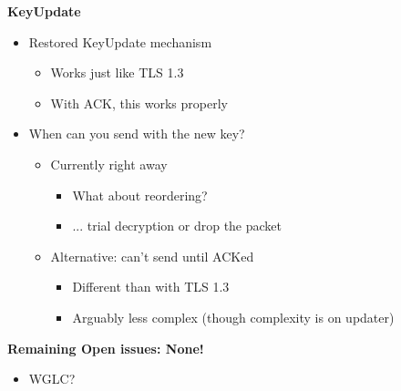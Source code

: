 \documentclass[helvetica]{seminar}
\newcommand{\heading}[1]{%
  \begin{center} 
    \large\bf 
    #1 
  \end{center} 
  \vspace{.4 in}}
\begin{document}
\begin{slide}
  \heading{KeyUpdate}

  \begin{itemize}
  \item Restored KeyUpdate mechanism
    \begin{itemize}
    \item Works just like TLS 1.3
    \item With ACK, this works properly
    \end{itemize}

  \item When can you send with the new key?
    \begin{itemize}
    \item Currently right away
      \begin{itemize}
      \item What about reordering?
      \item ... trial decryption or drop the packet        
      \end{itemize}

    \item Alternative: can't send until ACKed
      \begin{itemize}
      \item Different than with TLS 1.3
      \item Arguably less complex (though complexity is on updater)
      \end{itemize}
    \end{itemize}
  \end{itemize}

\end{slide}


\begin{slide}
\heading{Remaining Open issues: None!}

\begin{itemize}
\item WGLC?
\end{itemize}
\end{slide}
\end{document}
